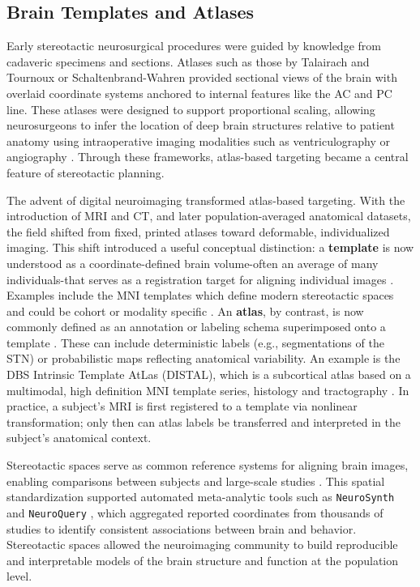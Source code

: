 \subsection{Brain Templates and Atlases}
\label{sec:template_atlas}
Early stereotactic neurosurgical procedures were guided by knowledge from cadaveric specimens and sections. Atlases such as those by Talairach and Tournoux \cite{Talairach1957-eb,Talairach1988-wk} or Schaltenbrand-Wahren \cite{Schaltenbrand1977-ge} provided sectional views of the brain with overlaid coordinate systems anchored to internal features like the AC and PC line. These atlases were designed to support proportional scaling, allowing neurosurgeons to infer the location of deep brain structures relative to patient anatomy using intraoperative imaging modalities such as ventriculography or angiography \cite{Conti2023-oo}. Through these frameworks, atlas-based targeting became a central feature of stereotactic planning.

The advent of digital neuroimaging transformed atlas-based targeting. With the introduction of MRI and CT, and later population-averaged anatomical datasets, the field shifted from fixed, printed atlases toward deformable, individualized imaging. This shift introduced a useful conceptual distinction: a \textbf{template} is now understood as a coordinate-defined brain volume-often an average of many individuals-that serves as a registration target for aligning individual images \cite{Evans2012-xp}. Examples include the MNI templates \cite{Avants2008-ek,Fonov2009-oi} which define modern stereotactic spaces and could be cohort or modality specific \cite{Lau2017-ea}. An \textbf{atlas}, by contrast, is now commonly defined as an annotation or labeling schema superimposed onto a template \cite{Chakravarty2006-ln}. These can include deterministic labels (e.g., segmentations of the STN) or probabilistic maps reflecting anatomical variability. An example is the DBS Intrinsic Template AtLas (DISTAL), which is a subcortical atlas based on a multimodal, high definition MNI template series, histology and tractography \cite{Ewert2018-bn}. In practice, a subject's MRI is first registered to a template via nonlinear transformation; only then can atlas labels be transferred and interpreted in the subject's anatomical context.

Stereotactic spaces serve as common reference systems for aligning brain images, enabling comparisons between subjects and large-scale studies \cite{Evans2012-xp}. This spatial standardization supported automated meta-analytic tools such as \texttt{NeuroSynth} \cite{Yarkoni2011-sr} and \texttt{NeuroQuery} \cite{Dockes2020-nw}, which aggregated reported coordinates from thousands of studies to identify consistent associations between brain and behavior. Stereotactic spaces allowed the neuroimaging community to build reproducible and interpretable models of the brain structure and function at the population level.

